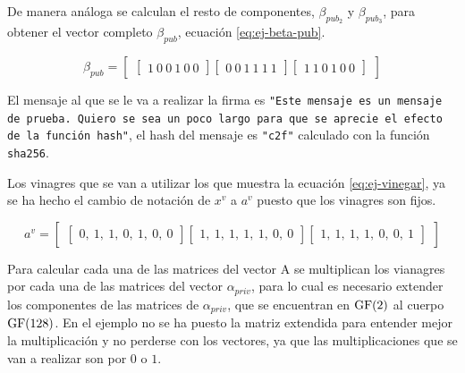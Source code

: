 De manera análoga se calculan el resto de componentes, $\beta_{pub_2}$ y $\beta_{pub_3}$, para obtener el vector completo $\beta_{pub}$, ecuación \ref{eq:ej-beta-pub}.

\begin{equation}\label{eq:ej-beta-pub}
{\beta_{pub}} = \left[
	\begin{array}{c}
	\left[\begin{array}{c}
		1\ 0\ 0\ 1\ 0\ 0
	\end{array}\right]
	
	\left[\begin{array}{c}
		0\ 0\ 1\ 1\ 1\ 1
	\end{array}\right]
	
	\left[\begin{array}{c}
		1\ 1\ 0\ 1\ 0\ 0
	\end{array}\right]
	\end{array}
	\right]
\end{equation}

El mensaje al que se le va a realizar la firma es \texttt{"{}Este mensaje es un mensaje de prueba. Quiero se sea un poco largo para que se aprecie el efecto de la función hash"{}}, el hash del mensaje es \texttt{"{}c2f"{}} calculado con la función \texttt{sha256}.

Los vinagres que se van a utilizar los que muestra la ecuación \ref{eq:ej-vinegar}, ya se ha hecho el cambio de notación de $x^v$ a $a^v$ puesto que los vinagres son fijos. 

\begin{equation}\label{eq:ej-vinegar}
{a^v} = \left[
	\begin{array}{c}
	\left[\begin{array}{c}
		0,\ 1,\ 1,\ 0,\ 1,\ 0,\ 0
	\end{array}\right]
	
	\left[\begin{array}{c}
		1,\ 1,\ 1,\ 1,\ 1,\ 0,\ 0
	\end{array}\right]
	
	\left[\begin{array}{c}
		1,\ 1,\ 1,\ 1,\ 0,\ 0,\ 1
	\end{array}\right]
	\end{array}
	\right]
\end{equation}

Para calcular cada una de las matrices del vector A se multiplican los vianagres por cada una de las matrices del vector $\alpha_{priv}$, para lo cual es necesario extender los componentes de las matrices de $\alpha_{priv}$, que se encuentran en $\operatorname{GF}(2)$ al cuerpo $\operatorname{GF}(128)$. En el ejemplo no se ha puesto la matriz extendida para entender mejor la multiplicación y no perderse con los vectores, ya que las multiplicaciones que se van a realizar son por $0$ o $1$.


